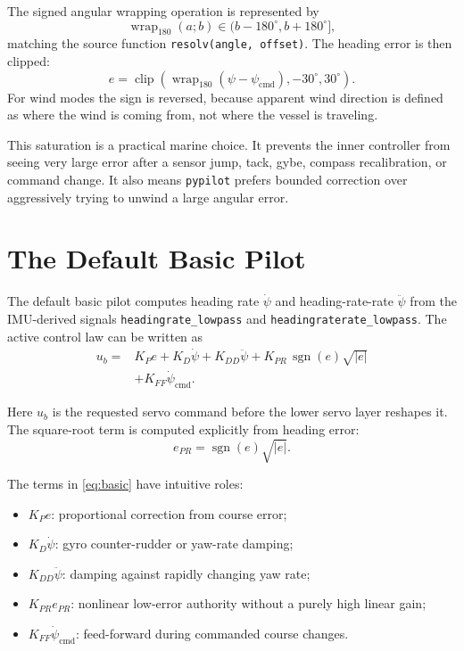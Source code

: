 \documentclass[11pt,twocolumn]{article}
\newcommand{\abs}[1]{\left\lvert #1 \right\rvert}
\newcommand{\wrap}{\operatorname{wrap}_{180}}
\newcommand{\sgn}{\operatorname{sgn}}
\newcommand{\clip}{\operatorname{clip}}
\newcommand{\heading}{\psi}
\newcommand{\cmd}{\mathrm{cmd}}
\begin{document}
The signed angular wrapping operation is represented by
\begin{equation}
  \wrap(a; b) \in (b-180^{\circ}, b+180^{\circ}],
\end{equation}
matching the source function \texttt{resolv(angle, offset)}.  The heading error is then
clipped:
\begin{equation}
  e = \clip\!\left(\wrap(\heading - \heading_{\cmd}), -30^{\circ}, 30^{\circ}\right).
  \label{eq:error-clip}
\end{equation}
For wind modes the sign is reversed, because apparent wind direction is defined as where
the wind is coming from, not where the vessel is traveling.

This saturation is a practical marine choice.  It prevents the inner controller from
seeing very large error after a sensor jump, tack, gybe, compass recalibration, or command
change.  It also means \texttt{pypilot} prefers bounded correction over aggressively
trying to unwind a large angular error.

\section{The Default Basic Pilot}

The default basic pilot computes heading rate \(\dot{\heading}\) and heading-rate-rate
\(\ddot{\heading}\) from the IMU-derived signals
\texttt{headingrate\_lowpass} and \texttt{headingraterate\_lowpass}.  The active control
law can be written as
\begin{equation}
\begin{split}
  u_b ={}& K_P e
        + K_D \dot{\heading}
        + K_{DD} \ddot{\heading}
        + K_{PR}\,\sgn(e)\sqrt{\abs{e}} \\
        &+ K_{FF}\dot{\heading}_{\cmd} .
\end{split}
\label{eq:basic}
\end{equation}

Here \(u_b\) is the requested servo command before the lower servo layer reshapes it.  The
square-root term is computed explicitly from heading error:
\begin{equation}
  e_{PR} = \sgn(e)\sqrt{\abs{e}}.
  \label{eq:pr}
\end{equation}

The terms in \cref{eq:basic} have intuitive roles:
\begin{itemize}
\item \(K_P e\): proportional correction from course error;
\item \(K_D\dot{\heading}\): gyro counter-rudder or yaw-rate damping;
\item \(K_{DD}\ddot{\heading}\): damping against rapidly changing yaw rate;
\item \(K_{PR}e_{PR}\): nonlinear low-error authority without a purely high linear gain;
\item \(K_{FF}\dot{\heading}_{\cmd}\): feed-forward during commanded course changes.
\end{itemize}
\end{document}
